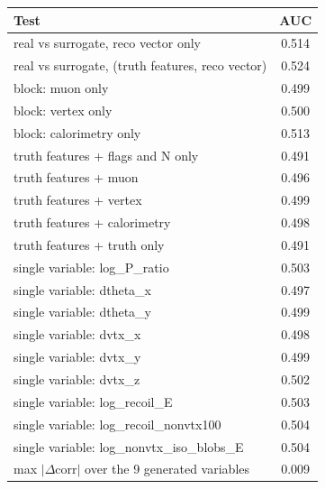 \begin{tabular}{lc}
\toprule
Test & AUC \\
\midrule
real vs surrogate, reco vector only & 0.514 \\
real vs surrogate, (truth features, reco vector) & 0.524 \\
\midrule
block: muon only & 0.499 \\
block: vertex only & 0.500 \\
block: calorimetry only & 0.513 \\
truth features + flags and N only & 0.491 \\
truth features + muon & 0.496 \\
truth features + vertex & 0.499 \\
truth features + calorimetry & 0.498 \\
truth features + truth only & 0.491 \\
single variable: log\_P\_ratio & 0.503 \\
single variable: dtheta\_x & 0.497 \\
single variable: dtheta\_y & 0.499 \\
single variable: dvtx\_x & 0.498 \\
single variable: dvtx\_y & 0.499 \\
single variable: dvtx\_z & 0.502 \\
single variable: log\_recoil\_E & 0.503 \\
single variable: log\_recoil\_nonvtx100 & 0.504 \\
single variable: log\_nonvtx\_iso\_blobs\_E & 0.504 \\
\midrule
max $|\Delta$corr$|$ over the 9 generated variables & 0.009 \\
\bottomrule
\end{tabular}
